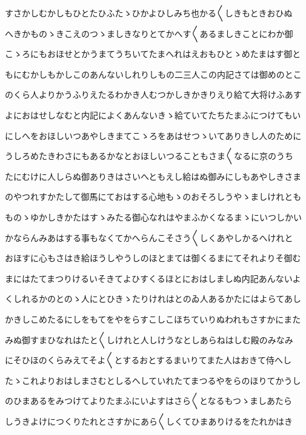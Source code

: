 \documentclass[a4paper,11pt,landscape]{ltjtarticle}
\begin{document}
\par\medskip
すさかしむかしもひとたひふたゝひかよひしみち也かる〱しきもときおひぬ
\par\medskip
へきかものゝきこえのつゝましきなりとてかへす〱あるましきことにわか御
\par\medskip
こゝろにもおほせとかうまてうちいてたまへれはえおもひとゝめたまはす御と
\par\medskip
もにむかしもかしこのあんないしれりしもの二三人この内記さては御めのとこ
\par\medskip
のくら人よりかうふりえたるわかき人むつかしきかきりえり給て大将けふあす
\par\medskip
よにおはせしなむと内記によくあんないきゝ給ていてたちたまふにつけてもい
\par\medskip
にしへをおほしいつあやしきまてこゝろをあはせつゝいてありきし人のために
\par\medskip
うしろめたきわさにもあるかなとおほしいつることもさま〱なるに京のうち
\par\medskip
たにむけに人しらぬ御ありきはさいへともえし給はぬ御みにしもあやしきさま
\par\medskip
のやつれすかたして御馬にておはする心地もゝのおそろしうやゝましけれとも
\par\medskip
ものゝゆかしきかたはすゝみたる御心なれはやまふかくなるまゝにいつしかい
\par\medskip
かならんみあはする事もなくてかへらんこそさう〱しくあやしかるへけれと
\par\medskip
おほすに心もさはき給ほうしやうしのほとまては御くるまにてそれよりそ御む
\par\medskip
まにはたてまつりけるいそきてよひすくるほとにおはしましぬ内記あんないよ
\par\medskip
くしれるかのとのゝ人にとひきゝたりけれはとのゐ人あるかたにはよらてあし
\par\medskip
かきしこめたるにしをもてをやをらすこしこほちていりぬわれもさすかにまた
\par\medskip
みぬ御すまひなれはたと〱しけれと人しけうなとしあらねはしむ殿のみなみ
\par\medskip
にそひほのくらみえてそよ〱とするおとするまいりてまた人はおきて侍へし
\par\medskip
たゝこれよりおはしまさむとしるへしていれたてまつるやをらのほりてかうし
\par\medskip
のひまあるをみつけてよりたまふにいよすはさら〱となるもつゝましあたら
\par\medskip
しうきよけにつくりたれとさすかにあら〱しくてひまありけるをたれかはき
\par\medskip
\end{document}
